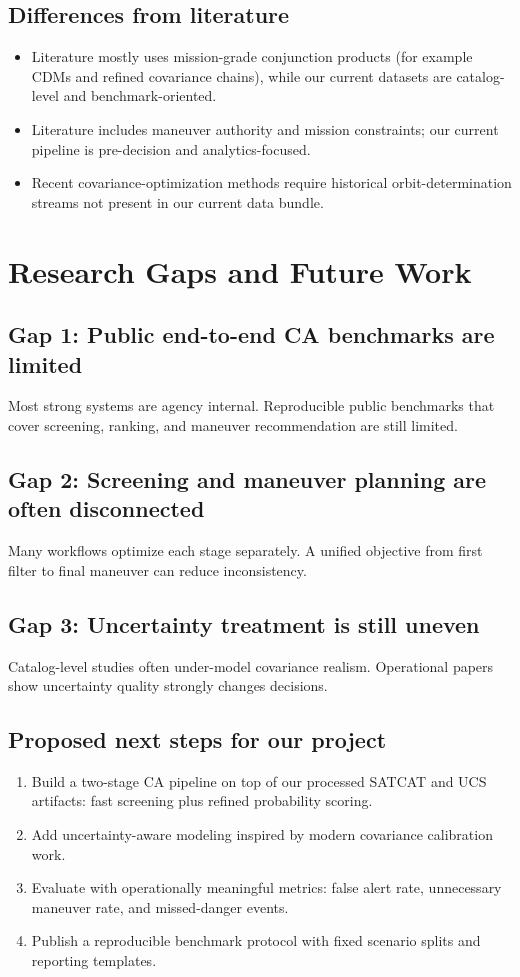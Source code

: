 \documentclass[11pt]{article}
\begin{document}
\subsection*{Differences from literature}
\begin{itemize}
\item Literature mostly uses mission-grade conjunction products (for example CDMs and refined covariance chains), while our current datasets are catalog-level and benchmark-oriented.
\item Literature includes maneuver authority and mission constraints; our current pipeline is pre-decision and analytics-focused.
\item Recent covariance-optimization methods require historical orbit-determination streams not present in our current data bundle.
\end{itemize}

\section*{Research Gaps and Future Work}

\subsection*{Gap 1: Public end-to-end CA benchmarks are limited}
Most strong systems are agency internal. Reproducible public benchmarks that cover screening, ranking, and maneuver recommendation are still limited.

\subsection*{Gap 2: Screening and maneuver planning are often disconnected}
Many workflows optimize each stage separately. A unified objective from first filter to final maneuver can reduce inconsistency.

\subsection*{Gap 3: Uncertainty treatment is still uneven}
Catalog-level studies often under-model covariance realism. Operational papers show uncertainty quality strongly changes decisions.

\subsection*{Proposed next steps for our project}
\begin{enumerate}
\item Build a two-stage CA pipeline on top of our processed SATCAT and UCS artifacts: fast screening plus refined probability scoring.
\item Add uncertainty-aware modeling inspired by modern covariance calibration work.
\item Evaluate with operationally meaningful metrics: false alert rate, unnecessary maneuver rate, and missed-danger events.
\item Publish a reproducible benchmark protocol with fixed scenario splits and reporting templates.
\end{enumerate}
\end{document}
